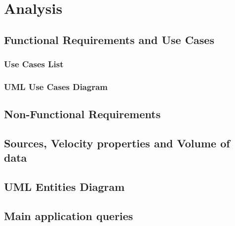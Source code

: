 \section{Analysis}
\subsection{Functional Requirements and Use Cases}
\subsubsection{Use Cases List}
\subsubsection{UML Use Cases Diagram}

\subsection{Non-Functional Requirements}
\subsection{Sources, Velocity properties and Volume of data}
\subsection{UML Entities Diagram}
\subsection{Main application queries}
